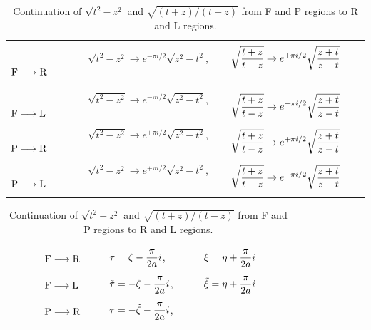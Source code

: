 \documentclass[aps,prd,preprintnumbers,nofootinbib,showpacs,11pt]{revtex4}%
\begin{document}
\begin{widetext}
\begin{center}
\begin{table}[t]
\begin{tabular}{lll}
\hline\\
~~~~~~
 ${\rm F} \longrightarrow {\rm R}$ ~~~&
 $\displaystyle{\sqrt{t^2-z^2}\rightarrow e^{-\pi i/2}\sqrt{z^2-t^2}}$, ~~~~&
 $\displaystyle{\sqrt{t+z\over t-z}\rightarrow e^{+\pi i/2} \sqrt{z+t\over z-t}}$
~~~~~~
\\
\\
~~~~~~
 ${\rm F} \longrightarrow {\rm L}$ ~~~&
 $\displaystyle{\sqrt{t^2-z^2}\rightarrow e^{-\pi i/2}\sqrt{z^2-t^2}}$, ~~~~&
 $\displaystyle{\sqrt{t+z\over t-z}\rightarrow e^{-\pi i/2} \sqrt{z+t\over z-t}}$
\\
\\
~~~~~~
 ${\rm P}  \longrightarrow {\rm R}$ ~~~&
 $\displaystyle{\sqrt{t^2-z^2}\rightarrow e^{+\pi i/2}\sqrt{z^2-t^2}}$, ~~~~&
 $\displaystyle{\sqrt{t+z\over t-z}\rightarrow e^{+\pi i/2} \sqrt{z+t\over z-t}}$
\\
\\
~~~~~~
 $ {\rm P}  \longrightarrow {\rm L}$ ~~~&
 $\displaystyle{\sqrt{t^2-z^2}\rightarrow e^{+\pi i/2}\sqrt{z^2-t^2}}$, ~~~~&
 $\displaystyle{\sqrt{t+z\over t-z}\rightarrow e^{-\pi i/2} \sqrt{z+t\over z-t}}$
\\
\\
\hline
\end{tabular}
\caption{Continuation of $\sqrt{t^2-z^2}$ and $\sqrt{(t+z)/(t-z)}$ 
from F and P regions to R and L regions.}
\label{tableone}
\vspace{1cm}
\begin{tabular}{lll}
\hline\\
~~~~~~
 ${\rm F} \longrightarrow {\rm R}$ ~~~&
 $\displaystyle{\tau=\zeta-{\pi \over 2a }i}$, ~~~~&
 $\displaystyle{\xi=\eta+{\pi \over 2a}i}$~~~~~~
\\
\\
~~~~~~
 ${\rm F} \longrightarrow {\rm L}$ ~~~&
 $\displaystyle{\tilde \tau =-\zeta-{\pi \over 2a }i}$,~~~~&
 $\displaystyle{\tilde \xi = \eta+{\pi \over 2a}i}$
\\
\\
~~~~~~
 ${\rm P}  \longrightarrow {\rm R}$ ~~~&
 $\displaystyle{\tau=-\tilde\zeta-{\pi \over 2a }i}$,~~~~&

\end{tabular}
\end{table}
\end{center}
\end{widetext}
\end{document}
